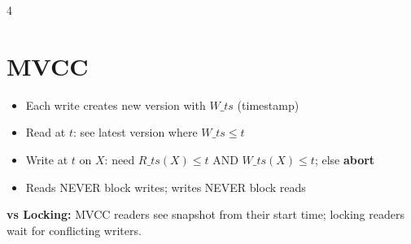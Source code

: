 \documentclass[8pt,letterpaper]{article}
\newcommand{\key}[1]{\textbf{\color{red!70!black}#1}}
\begin{document}
\begin{multicols*}{4}
\section{MVCC}
\begin{itemize}
  \item Each write creates new version with $W\_ts$ (timestamp)
  \item Read at $t$: see latest version where $W\_ts \le t$
  \item Write at $t$ on $X$: need $R\_ts(X)\le t$ AND $W\_ts(X)\le t$; else \textbf{abort}
  \item Reads NEVER block writes; writes NEVER block reads
\end{itemize}
\key{vs Locking:} MVCC readers see snapshot from their start time; locking readers wait for conflicting writers.

\end{multicols*}
\newpage
\end{document}
